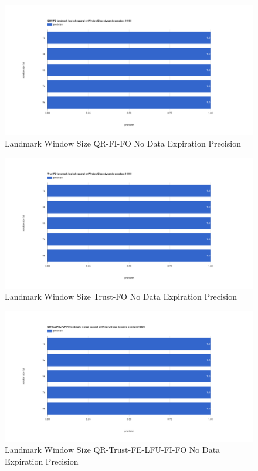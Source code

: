 \begin{figure}[!htbp]
    \centering
    \includegraphics[width=\textwidth]{img/app3-land-ws-qrfifo-no-p.png}
    \caption{Landmark Window Size QR-FI-FO No Data Expiration Precision}
\end{figure}
\begin{figure}[!htbp]
    \centering
    \includegraphics[width=\textwidth]{img/app3-land-ws-trustfo-no-p.png}
    \caption{Landmark Window Size Trust-FO No Data Expiration Precision}
\end{figure}
\begin{figure}[!htbp]
    \centering
    \includegraphics[width=\textwidth]{img/app3-land-ws-qrtrustfelfufifo-no-p.png}
    \caption{Landmark Window Size QR-Trust-FE-LFU-FI-FO No Data Expiration Precision}
\end{figure}

